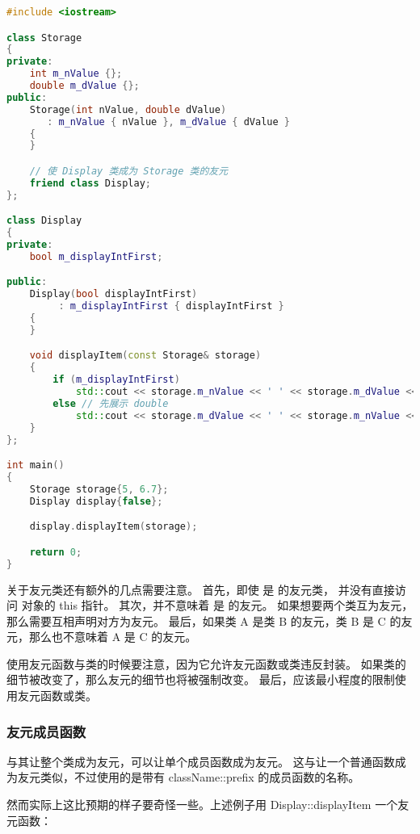 \documentclass[../../LearnCpp.tex]{subfiles}
\begin{document}
\begin{lstlisting}[language=C++]
#include <iostream>

class Storage
{
private:
    int m_nValue {};
    double m_dValue {};
public:
    Storage(int nValue, double dValue)
       : m_nValue { nValue }, m_dValue { dValue }
    {
    }

    // 使 Display 类成为 Storage 类的友元
    friend class Display;
};

class Display
{
private:
    bool m_displayIntFirst;

public:
    Display(bool displayIntFirst)
         : m_displayIntFirst { displayIntFirst }
    {
    }

    void displayItem(const Storage& storage)
    {
        if (m_displayIntFirst)
            std::cout << storage.m_nValue << ' ' << storage.m_dValue << '\n';
        else // 先展示 double
            std::cout << storage.m_dValue << ' ' << storage.m_nValue << '\n';
    }
};

int main()
{
    Storage storage{5, 6.7};
    Display display{false};

    display.displayItem(storage);

    return 0;
}
\end{lstlisting}

关于友元类还有额外的几点需要注意。
首先，即使  是  的友元类， 并没有直接访问  对象的 \*this 指针。
其次，并不意味着  是  的友元。
如果想要两个类互为友元，那么需要互相声明对方为友元。
最后，如果类 A 是类 B 的友元，类 B 是 C 的友元，那么也不意味着 A 是 C 的友元。

使用友元函数与类的时候要注意，因为它允许友元函数或类违反封装。
如果类的细节被改变了，那么友元的细节也将被强制改变。
最后，应该最小程度的限制使用友元函数或类。

\subsubsection*{友元成员函数}

与其让整个类成为友元，可以让单个成员函数成为友元。
这与让一个普通函数成为友元类似，不过使用的是带有 className::prefix 的成员函数的名称。

然而实际上这比预期的样子要奇怪一些。上述例子用 Display::displayItem 一个友元函数：
\end{document}
